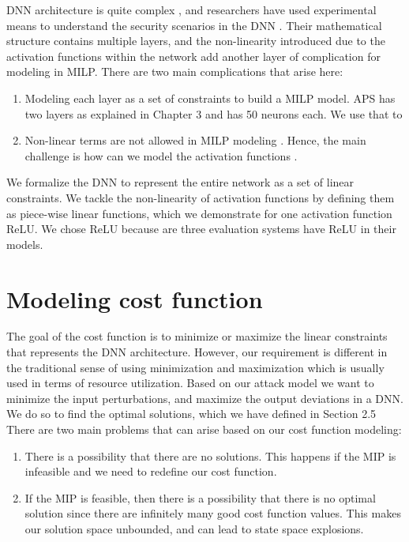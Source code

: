 DNN architecture is quite complex , and researchers have used experimental means to understand the security scenarios in the DNN . 
Their  mathematical structure contains multiple layers, and the non-linearity introduced due to the activation functions within the network add another layer of complication for modeling in \ac{MILP}.
There are two main complications that arise here:
\begin{enumerate}
	\item Modeling each layer as a set of constraints to build a \ac{MILP} model.
	\ac{APS} has two layers as explained in Chapter 3 and has 50 neurons each. 
	We use that to 
	\item Non-linear terms are not allowed in \ac{MILP} modeling . Hence, the main challenge is how can we model the activation functions . 
\end{enumerate}

We formalize the \ac{DNN} to represent the entire network as a set of linear constraints. 
We tackle the non-linearity of activation functions by defining them as piece-wise linear functions, 
which we demonstrate for one activation function ReLU.
We chose ReLU because are three evaluation systems  have ReLU in their models. 

\section{Modeling cost function}
The goal of the cost function is to minimize or maximize the linear constraints that represents the \ac{DNN} architecture. 
However, our requirement is different in the traditional sense of using minimization and maximization which is usually used in terms of resource utilization.  
Based on our attack model we want to minimize the input perturbations, and maximize the output deviations in a \ac{DNN}.
We do so to find the optimal solutions, which we have defined in Section 2.5
There are two main problems that can arise based on our cost function modeling:
\begin{enumerate}
	\item There is a possibility that there are no solutions. 
	This happens if the \ac{MIP} is infeasible and we need to redefine our cost function. 
	\item If the \ac{MIP} is feasible, then there is a possibility that there is no optimal solution since there are infinitely many good cost function values. 
	This makes our solution space unbounded, and can lead to state space explosions. 
\end{enumerate}


